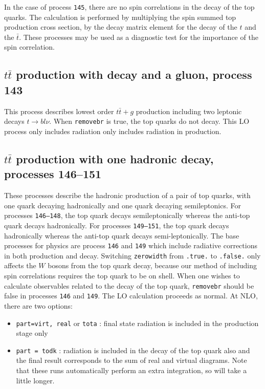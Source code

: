 In the case of process {\tt 145}, there are no spin correlations in
the decay of the top quarks. The calculation is performed by
multiplying the spin summed top production cross section, by the decay
matrix element for the decay of the $t$ and the $\bar{t}$. These
processes may be used as a diagnostic test for the importance of the
spin correlation.



\subsection{$t\bar{t}$ production with decay and a gluon, process 143}
This process describes lowest order $t \bar{t}+g$ production 
including two leptonic decays $t \to b l \nu$. 
When {\tt removebr} is true, the top quarks do not decay.
This LO process only includes radiation only includes radiation in production.

\subsection{$t\bar{t}$ production with one hadronic decay, processes 146--151}

These processes describe the hadronic production of a pair of top
quarks, with one quark decaying hadronically and one quark decaying
semileptonics.  For processes {\tt 146--148}, the top quark decays
semileptonically whereas the anti-top quark decays hadronically.  For
processes {\tt 149--151}, the top quark decays hadronically whereas the
anti-top quark decays semi-leptonically.  The base processes for
physics are process {\tt 146} and {\tt 149} which include
radiative corrections in both production and decay.  Switching {\tt zerowidth} from 
{\tt .true.} to {\tt .false.} only affects the $W$ bosons from the top
quark decay, because our method of including spin correlations
requires the top quark to be on shell.
When one wishes to calculate observables related to the decay of the top
quark, {\tt removebr} should be false in processes {\tt 146} and {\tt 149}.
The LO calculation proceeds as normal. At NLO, there are two options:
\begin{itemize}
\item {\tt part=virt, real} or {\tt tota} : final state radiation is included
in the production stage only
\item {\tt part = todk} : radiation is included in the decay of the top
quark also and the final result corresponds to the sum of real and virtual
diagrams. 
Note that these runs automatically perform an extra integration, so
will take a little longer.
\end{itemize}


